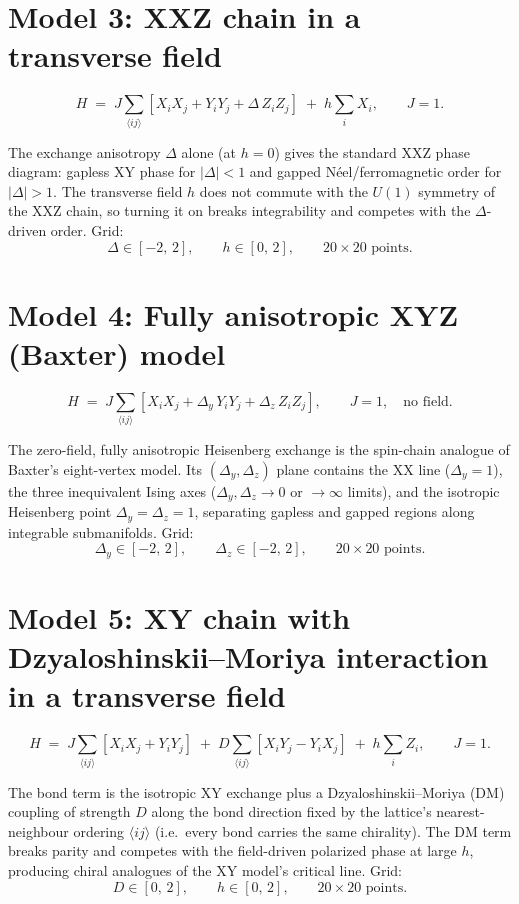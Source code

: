\documentclass[11pt]{article}
\newcommand{\X}{X}
\newcommand{\Y}{Y}
\newcommand{\Z}{Z}
\begin{document}
\section{Model 3: XXZ chain in a transverse field}

\[
  H \;=\; J \sum_{\langle ij\rangle}
    \left[ \X_i \X_j + \Y_i \Y_j + \Delta\, \Z_i \Z_j \right]
    \;+\; h \sum_i \X_i,
  \qquad J = 1 .
\]

The exchange anisotropy $\Delta$ alone (at $h=0$) gives the standard XXZ
phase diagram: gapless XY phase for $|\Delta|<1$ and gapped Néel/ferromagnetic
order for $|\Delta|>1$. The transverse field $h$ does not commute with the
$U(1)$ symmetry of the XXZ chain, so turning it on breaks integrability and
competes with the $\Delta$-driven order. Grid:
\[
  \Delta \in [-2,\,2], \qquad h \in [0,\,2], \qquad 20\times20 \text{ points}.
\]

\section{Model 4: Fully anisotropic XYZ (Baxter) model}

\[
  H \;=\; J \sum_{\langle ij\rangle}
    \left[ \X_i \X_j + \Delta_y\, \Y_i \Y_j + \Delta_z\, \Z_i \Z_j \right],
  \qquad J = 1, \quad \text{no field} .
\]

The zero-field, fully anisotropic Heisenberg exchange is the spin-chain
analogue of Baxter's eight-vertex model. Its $(\Delta_y,\Delta_z)$ plane
contains the XX line ($\Delta_y=1$), the three inequivalent Ising axes
($\Delta_y,\Delta_z \to 0$ or $\to\infty$ limits), and the isotropic
Heisenberg point $\Delta_y=\Delta_z=1$, separating gapless and gapped regions
along integrable submanifolds. Grid:
\[
  \Delta_y \in [-2,\,2], \qquad \Delta_z \in [-2,\,2], \qquad 20\times20 \text{ points}.
\]

\section{Model 5: XY chain with Dzyaloshinskii--Moriya interaction in a transverse field}

\[
  H \;=\; J \sum_{\langle ij\rangle} \left[ \X_i \X_j + \Y_i \Y_j \right]
    \;+\; D \sum_{\langle ij\rangle} \left[ \X_i \Y_j - \Y_i \X_j \right]
    \;+\; h \sum_i \Z_i,
  \qquad J = 1 .
\]

The bond term is the isotropic XY exchange plus a Dzyaloshinskii--Moriya
(DM) coupling of strength $D$ along the bond direction fixed by the lattice's
nearest-neighbour ordering $\langle ij\rangle$ (i.e.\ every bond carries the
same chirality). The DM term breaks parity and competes with the
field-driven polarized phase at large $h$, producing chiral analogues of the
XY model's critical line. Grid:
\[
  D \in [0,\,2], \qquad h \in [0,\,2], \qquad 20\times20 \text{ points}.
\]
\end{document}
